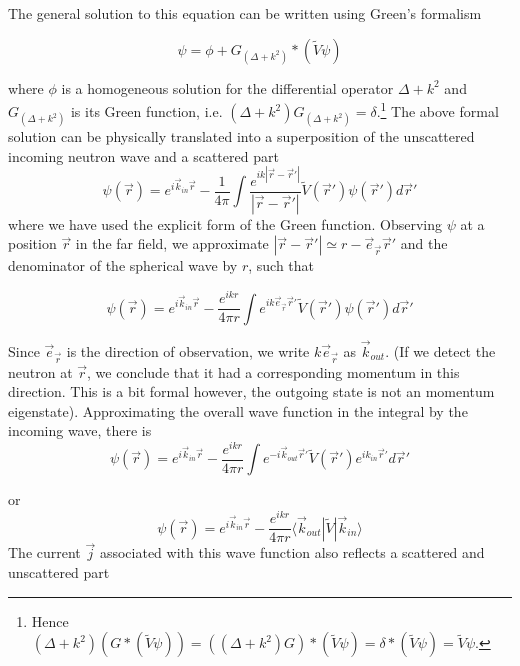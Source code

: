 \documentclass[11pt,a4paper]{article}
\begin{document}
The general solution to this equation can be written using Green's formalism

\begin{equation}
\psi = \phi + G_{(\Delta + k^ 2)}*(\tilde V \psi)
\end{equation}

where $\phi$ is a homogeneous solution for the differential operator $\Delta + k^ 2$ and $G_{(\Delta + k^ 2)}$ is its Green function, 
i.e. $(\Delta + k^ 2)G_{(\Delta + k^ 2)} = \delta$.\footnote{
Hence $(\Delta + k^ 2)(G*(\tilde V \psi)) = ((\Delta + k^ 2)G)*(\tilde V \psi) = \delta * (\tilde V \psi) = \tilde V \psi$.}
The above formal solution can be physically translated into a superposition of the unscattered incoming neutron wave and a scattered part
\begin{equation}
\psi(\vec r) = e^{i \vec k_{in} \vec r} - \frac{1}{4 \pi} \int \frac{ e^{ik |\vec r -\vec r'|} }{ |\vec r -\vec r'|}  \tilde V(\vec r') \psi (\vec r') d \vec r'
\end{equation}
where we have used the explicit form of the Green function. Observing $\psi$ at a position $\vec r$ in the far field, we approximate
$|\vec r -\vec r'| \simeq r - \vec e_{\vec r} \vec r'$ and the denominator of the spherical wave by $r$, such that

\begin{equation}
\psi(\vec r) = e^{i \vec k_{in} \vec r} - \frac{e^{ikr}}{4 \pi r}\int  e^{ik \vec e_{\vec r } \vec r'}  \tilde V(\vec r') \psi (\vec r') d \vec r'
\end{equation}

Since $\vec e_{\vec r }$  is the direction of observation, we write $k \vec e_{\vec r }$ as $\vec k_{out}$. (If we detect the neutron at $\vec r$,
we conclude that it had a corresponding momentum in this direction. This is a bit formal however, the outgoing state is
not an momentum eigenstate). Approximating the overall wave function in the integral by the incoming wave,
there is
\begin{equation}
\psi(\vec r) = e^{i \vec k_{in} \vec r} - \frac{e^{ikr}}{4 \pi r}\int  e^{-i \vec k_{out} \vec r'}  \tilde V(\vec r')  e^{ik_{in} \vec r'} d \vec r'
\end{equation}

or
\begin{equation}
\psi(\vec r) = e^{i \vec k_{in} \vec r} - \frac{e^{ikr}}{4 \pi r}  \langle \vec k_{out} | \tilde V | \vec k_{in} \rangle
\end{equation}
The current $\vec j$ associated with this wave function also reflects a scattered and unscattered part
\end{document}
